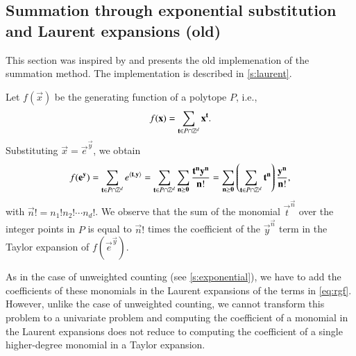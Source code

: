 \subsection{Summation through exponential substitution and Laurent expansions (old)}
\label{s:laurent:old}

This section was inspired by  and
presents the old implemenation of the 
summation method.  The implementation is described in \autoref{s:laurent}.

Let $f(\vec x)$ be the generating function of a polytope $P$,
i.e.,
$$
f(\vec x) = \sum_{\vec t \in P \cap \ZZ^d} \vec x^{\vec t}
.
$$
Substituting $\vec x = \vec e^{\vec y}$, we obtain
$$
f(\vec e^{\vec y}) = \sum_{\vec t \in P \cap \ZZ^d} e^{\sp t y}
=
\sum_{\vec t \in P \cap \ZZ^d}
    \sum_{\vec n \ge \vec 0} \frac{\vec t^{\vec n} \vec y^{\vec n}}{\vec n!}
=
\sum_{\vec n \ge \vec 0}
    \left(\sum_{\vec t \in P \cap \ZZ^d} \vec t^{\vec n}\right)
	\frac{\vec y^{\vec n}}{\vec n!}
,
$$
with $\vec n! = n_1! n_2! \cdots n_d!$.
We observe that the sum of the monomial $\vec t^{\vec n}$
over the integer points in $P$ is equal to $\vec n!$ times the coefficient
of the $\vec y^{\vec n}$ term in the Taylor expansion of $f(\vec e^{\vec y})$.

As in the case of unweighted counting (see \autoref{s:exponential}),
we have to add the coefficients
of these monomials in the Laurent expansions of the terms in \eqref{eq:rgf}.
However, unlike the case of unweighted counting, we cannot transform
this problem to a univariate problem and computing the coefficient
of a monomial in the Laurent expansions does not reduce to computing
the coefficient of a single higher-degree monomial in a Taylor expansion.

